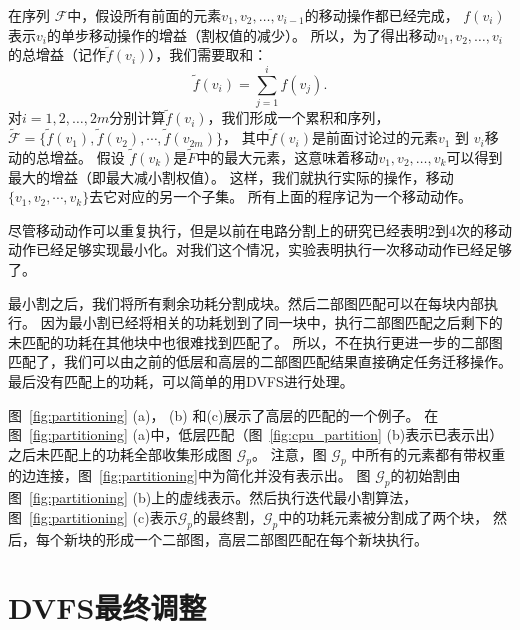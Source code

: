 在序列 $\mathcal{F}$中，假设所有前面的元素$v_1, v_2, \ldots, v_{i-1}$的移动操作都已经完成， $f(v_i)$表示$v_i$的单步移动操作的增益（割权值的减少）。
所以，为了得出移动$v_1, v_2, \ldots, v_i$的总增益（记作$\tilde{f}(v_i)$），我们需要取和：
\begin{equation}
\tilde{f}(v_i) = \sum\limits_{j=1}^i f(v_j).
\end{equation}
对$i=1,2, \ldots, 2m$分别计算$\tilde{f}(v_i)$，我们形成一个累积和序列，
$\tilde{\mathcal{F}} = \{\tilde{f}(v_1), \tilde{f}(v_2), \cdots,
\tilde{f}(v_{2m})\}$，
其中$\tilde{f}(v_i)$是前面讨论过的元素$v_1$ 到 $v_i$移动的总增益。
假设 $\tilde{f}(v_k)$是$\tilde{F}$中的最大元素，这意味着移动$v_1, v_2, \ldots, v_k$可以得到最大的增益（即最大减小割权值）。
这样，我们就执行实际的操作，移动$\{v_1, v_2, \cdots, v_k\}$去它对应的另一个子集。
所有上面的程序记为一个移动动作。

尽管移动动作可以重复执行，但是以前在电路分割上的研究已经表明2到4次的移动动作已经足够实现最小化。对我们这个情况，实验表明执行一次移动动作已经足够了。

最小割之后，我们将所有剩余功耗分割成块。然后二部图匹配可以在每块内部执行。
因为最小割已经将相关的功耗划到了同一块中，执行二部图匹配之后剩下的未匹配的功耗在其他块中也很难找到匹配了。
所以，不在执行更进一步的二部图匹配了，我们可以由之前的低层和高层的二部图匹配结果直接确定任务迁移操作。
最后没有匹配上的功耗，可以简单的用DVFS进行处理。

图~\ref{fig:partitioning} (a)， (b) 和(c)展示了高层的匹配的一个例子。
在图~\ref{fig:partitioning} (a)中，低层匹配（图~\ref{fig:cpu_partition} (b)表示已表示出）之后未匹配上的功耗全部收集形成图 $\mathcal{G}_p$。
注意，图 $\mathcal{G}_p$ 中所有的元素都有带权重的边连接，图~\ref{fig:partitioning}中为简化并没有表示出。
图 $\mathcal{G}_p$的初始割由图~\ref{fig:partitioning} (b)上的虚线表示。然后执行迭代最小割算法，
图~\ref{fig:partitioning} (c)表示$\mathcal{G}_p$的最终割，$\mathcal{G}_p$中的功耗元素被分割成了两个块，
然后，每个新块的形成一个二部图，高层二部图匹配在每个新块执行。


\section{DVFS最终调整}\label{sec:dvfs_adj}




















































